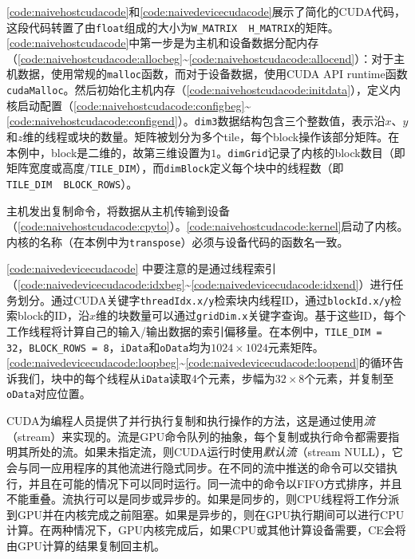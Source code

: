 \autoref{code:naivehostcudacode}和\autoref{code:naivedevicecudacode}展示了简化的CUDA代码，这段代码转置了由\texttt{float}组成的大小为\texttt{W\_MATRIX\ \times\ H\_MATRIX}的矩阵。\autoref{code:naivehostcudacode}中第一步是为主机和设备数据分配内存（\autoref{code:naivehostcudacode:allocbeg}\textasciitilde\autoref{code:naivehostcudacode:allocend}）：对于主机数据，使用常规的\texttt{malloc}函数，而对于设备数据，使用CUDA API runtime函数\texttt{cudaMalloc}。然后初始化主机内存（\autoref{code:naivehostcudacode:initdata}），定义内核启动配置（\autoref{code:naivehostcudacode:configbeg}\textasciitilde\autoref{code:naivehostcudacode:configend}）。\texttt{dim3}数据结构包含三个整数值，表示沿$x$、$y$和$z$维的线程或块的数量。矩阵被划分为多个tile，每个block操作该部分矩阵。在本例中，block是二维的，故第三维设置为$1$。\texttt{dimGrid}记录了内核的block数目（即矩阵宽度或高度/\texttt{TILE\_DIM}），而\texttt{dimBlock}定义每个块中的线程数（即\texttt{TILE\_DIM\ \times\ BLOCK\_ROWS}）。

主机发出复制命令，将数据从主机传输到设备（\autoref{code:naivehostcudacode:cpyto}）。\autoref{code:naivehostcudacode:kernel}启动了内核。内核的名称（在本例中为\texttt{transpose}）必须与设备代码的函数名一致。

\autoref{code:naivedevicecudacode} 中要注意的是通过线程索引（\autoref{code:naivedevicecudacode:idxbeg}\textasciitilde\autoref{code:naivedevicecudacode:idxend}）进行任务划分。通过CUDA关键字\texttt{threadIdx.x/y}检索块内线程ID，通过\texttt{blockId.x/y}检索block的ID，沿$x$维的块数量可以通过\texttt{gridDim.x}关键字查询。基于这些ID，每个工作线程将计算自己的输入/输出数据的索引偏移量。在本例中，\texttt{TILE\_DIM = 32}，\texttt{BLOCK\_ROWS = 8}，\texttt{iData}和\texttt{oData}均为$ 1024\times 1024 $元素矩阵。\autoref{code:naivedevicecudacode:loopbeg}\textasciitilde\autoref{code:naivedevicecudacode:loopend}的循环告诉我们，块中的每个线程从\texttt{iData}读取4个元素，步幅为$32 \times 8$个元素，并复制至\texttt{oData}对应位置。

CUDA为编程人员提供了并行执行复制和执行操作的方法，这是通过使用\emph{流}（stream）来实现的。流是GPU命令队列的抽象，每个复制或执行命令都需要指明其所处的流。如果未指定流，则CUDA运行时使用\emph{默认流}（stream NULL），它会与同一应用程序的其他流进行隐式同步。在不同的流中推送的命令可以交错执行，并且在可能的情况下可以同时运行。同一流中的命令以FIFO方式排序，并且不能重叠。流执行可以是同步或异步的。如果是同步的，则CPU线程将工作分派到GPU并在内核完成之前阻塞。如果是异步的，则在GPU执行期间可以进行CPU计算。在两种情况下，GPU内核完成后，如果CPU或其他计算设备需要，CE会将由GPU计算的结果复制回主机。

